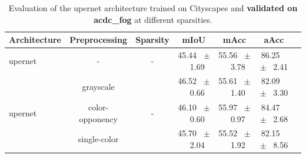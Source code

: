 \begin{table}[h]
  \centering
  \caption{Evaluation of the upernet architecture trained on Cityscapes and \textbf{validated on acdc_fog} at different sparsities.}
  \begin{tabular}{@{}lccc ccc@{}}
    \toprule
    Architecture & Preprocessing & Sparsity & mIoU & mAcc & aAcc \\
    \midrule
    upernet & - & - & 45.44 ~$\pm$~ 1.69 & 55.56 ~$\pm$~ 3.78 & 86.25 ~$\pm$~ 2.41 \\
    \midrule
    \midrule
    \multirow{3}{*}{upernet} & grayscale & \multirow{3}{*}{-} & 46.52 ~$\pm$~ 0.66 & 55.61 ~$\pm$~ 1.40 & 82.09 ~$\pm$~ 3.30 \\
    & color-opponency & & 46.10 ~$\pm$~ 0.60 & 55.97 ~$\pm$~ 0.97 & 84.47 ~$\pm$~ 2.68 \\
    & single-color & & 45.70 ~$\pm$~ 2.04 & 55.52 ~$\pm$~ 1.92 & 82.15 ~$\pm$~ 8.56 \\
    \midrule
    \bottomrule
  \end{tabular}
  \label{tab:sparse_upernet_acdc_fog}
\end{table}